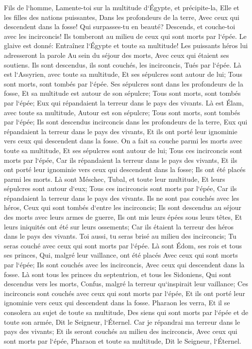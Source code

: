 \verse Fils de l`homme, Lamente-toi sur la multitude d`Égypte, et précipite-la, Elle et les filles des nations puissantes, Dans les profondeurs de la terre, Avec ceux qui descendent dans la fosse! 
\verse Qui surpasses-tu en beauté? Descends, et couche-toi avec les incirconcis! 
\verse Ils tomberont au milieu de ceux qui sont morts par l`épée. Le glaive est donné: Entraînez l`Égypte et toute sa multitude! 
\verse Les puissants héros lui adresseront la parole Au sein du séjour des morts, Avec ceux qui étaient ses soutiens. Ils sont descendus, ils sont couchés, les incirconcis, Tués par l`épée. 
\verse Là est l`Assyrien, avec toute sa multitude, Et ses sépulcres sont autour de lui; Tous sont morts, sont tombés par l`épée. 
\verse Ses sépulcres sont dans les profondeurs de la fosse, Et sa multitude est autour de son sépulcre; Tous sont morts, sont tombés par l`épée; Eux qui répandaient la terreur dans le pays des vivants. 
\verse Là est Élam, avec toute sa multitude, Autour est son sépulcre; Tous sont morts, sont tombés par l`épée; Ils sont descendus incirconcis dans les profondeurs de la terre, Eux qui répandaient la terreur dans le pays des vivants, Et ils ont porté leur ignominie vers ceux qui descendent dans la fosse. 
\verse On a fait sa couche parmi les morts avec toute sa multitude, Et ses sépulcres sont autour de lui; Tous ces incirconcis sont morts par l`épée, Car ils répandaient la terreur dans le pays des vivants, Et ils ont porté leur ignominie vers ceux qui descendent dans la fosse; Ils ont été placés parmi les morts. 
\verse Là sont Méschec, Tubal, et toute leur multitude, Et leurs sépulcres sont autour d`eux; Tous ces incirconcis sont morts par l`épée, Car ils répandaient la terreur dans le pays des vivants. 
\verse Ils ne sont pas couchés avec les héros, Ceux qui sont tombés d`entre les incirconcis; Ils sont descendus au séjour des morts avec leurs armes de guerre, Ils ont mis leurs épées sous leurs têtes, Et leurs iniquités ont été sur leurs ossements; Car ils étaient la terreur des héros dans le pays des vivants. 
\verse Toi aussi, tu seras brisé au milieu des incirconcis; Tu seras couché avec ceux qui sont morts par l`épée. 
\verse Là sont Édom, ses rois et tous ses princes, Qui, malgré leur vaillance, ont été placés Avec ceux qui sont morts par l`épée; Ils sont couchés avec les incirconcis, Avec ceux qui descendent dans la fosse. 
\verse Là sont tous les princes du septentrion, et tous les Sidoniens, Qui sont descendus vers les morts, Confus, malgré la terreur qu`inspirait leur vaillance; Ces incirconcis sont couchés avec ceux qui sont morts par l`épée, Et ils ont porté leur ignominie vers ceux qui descendent dans la fosse. 
\verse Pharaon les verra, Et il se consolera au sujet de toute sa multitude, Des siens qui sont morts par l`épée et de toute son armée, Dit le Seigneur, l`Éternel. 
\verse Car je répandrai ma terreur dans le pays des vivants; Et ils seront couchés au milieu des incirconcis, Avec ceux qui sont morts par l`épée, Pharaon et toute sa multitude, Dit le Seigneur, l`Éternel. 

